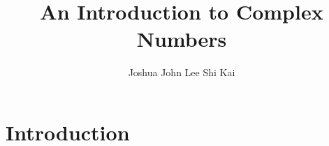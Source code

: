 \documentclass{article}
\title{An Introduction to Complex Numbers}
\author{Joshua John Lee Shi Kai}
\begin{document}
\maketitle

\newpage

\section*{Introduction}
\end{document}
